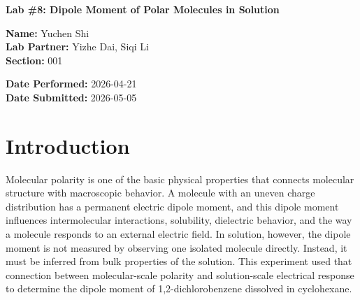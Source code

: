 \documentclass[11pt]{article}
\begin{document}
\begin{center}
    \Large \textbf{Lab \#8: Dipole Moment of Polar Molecules in Solution}
\end{center}
\vspace{0.5em}
\noindent
\begin{minipage}[t]{0.5\textwidth}
    \small
    \textbf{Name:} Yuchen Shi \\
    \textbf{Lab Partner:} Yizhe Dai, Siqi Li \\ 
    \textbf{Section:} 001
\end{minipage}%
\begin{minipage}[t]{0.5\textwidth}
    \small \raggedleft
    \textbf{Date Performed:} 2026-04-21 \\ 
    \textbf{Date Submitted:} 2026-05-05  
\end{minipage}
\vspace{1.5em}

\begin{abstract}
The dipole moment of 1,2-dichlorobenzene in cyclohexane was determined using dielectric-constant and refractive-index measurements of dilute solutions. Dielectric constants were measured with a dielectric constant meter, and refractive indices were measured with a refractometer. Linear fits of $\kappa$, $\rho$, and $n^2$ against solute mole fraction supplied the infinite-dilution parameters used in the Hedestrand and Smith-Guggenheim analyses. The Hedestrand method gave a result of $\mu=(2.3784\pm0.0347)\ \mathrm{D}$, while the Smith-Guggenheim method gave $\mu=(2.3831\pm0.0342)\ \mathrm{D}$. Both values were consistent and slightly lower than the literature value, $2.5000\pm0.0500\ \mathrm{D}$, with percent errors of $4.8649\%$ and $4.6760\%$ respectively. The close agreement between the two methods indicates reliable measurements of the experimental values and analysis methods, while the small negative deviation likely reflects experimental systematic errors.
\end{abstract}

\section*{Introduction}

Molecular polarity is one of the basic physical properties that connects molecular structure with macroscopic behavior. A molecule with an uneven charge distribution has a permanent electric dipole moment, and this dipole moment influences intermolecular interactions, solubility, dielectric behavior, and the way a molecule responds to an external electric field. In solution, however, the dipole moment is not measured by observing one isolated molecule directly. Instead, it must be inferred from bulk properties of the solution. This experiment used that connection between molecular-scale polarity and solution-scale electrical response to determine the dipole moment of 1,2-dichlorobenzene dissolved in cyclohexane.
\end{document}

